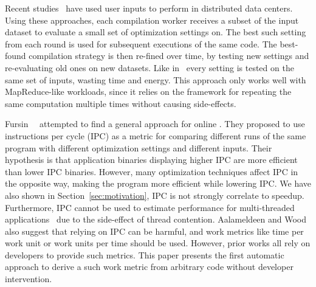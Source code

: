 Recent studies~\cite{chen12b,fang15} have used user inputs to perform {\itercomp} in distributed data centers. Using these approaches, each
compilation worker receives a subset of the input dataset to evaluate a small set of optimization settings on. The best such setting from
each round is used for subsequent executions of the same code. The best-found compilation strategy is then re-fined over time, by testing
new settings and re-evaluating old ones on new datasets. Like in~\cite{chen10} every setting is tested on the same set of inputs, wasting
time and energy. This approach only works well with MapReduce-like workloads, since it relies on the framework for repeating the same
computation multiple times without causing side-effects.

Fursin~\etal~\cite{fursin07} attempted to find a general approach for online \itercomp. They proposed to use instructions per cycle (IPC)
as a metric for comparing different runs of the same program with different optimization settings and different inputs. Their hypothesis is
that application binaries displaying higher IPC are more efficient than lower IPC binaries. However, many optimization techniques affect
IPC in the opposite way, making the program more efficient while lowering IPC. We have also shown in Section~\ref{sec:motivation}, IPC is
not strongly correlate to speedup. Furthermore, IPC cannot be used to estimate performance for multi-threaded
applications~\cite{alameldeen06,eyerman08} due to the side-effect of thread contention. Aalameldeen and Wood~\cite{alameldeen06} also
suggest that relying on IPC can be harmful, and work metrics like time per work unit or work units per time should be used. However, prior
works all rely on developers to provide such metrics. This paper presents the first automatic approach to derive a such work metric from
arbitrary code without developer intervention.




